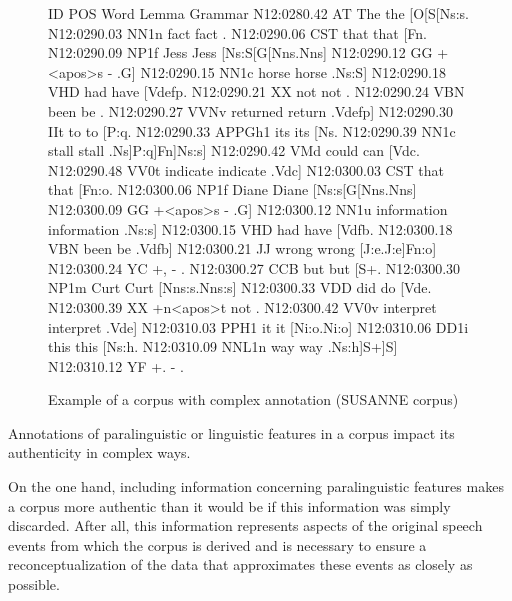 \begin{figure}
\caption{Example of a corpus with complex annotation (SUSANNE corpus)}
\label{fig:susanneannotation}
\hrulefill
\begin{fitverb}
ID           POS     Word         Lemma        Grammar
N12:0280.42  AT      The          the          [O[S[Ns:s.
N12:0290.03  NN1n    fact         fact         .
N12:0290.06  CST     that         that         [Fn.
N12:0290.09  NP1f    Jess         Jess         [Ns:S[G[Nns.Nns]
N12:0290.12  GG      +<apos>s     -            .G]
N12:0290.15  NN1c    horse        horse        .Ns:S]
N12:0290.18  VHD     had          have         [Vdefp.
N12:0290.21  XX      not          not          .
N12:0290.24  VBN     been         be           .
N12:0290.27  VVNv    returned     return        .Vdefp]
N12:0290.30  IIt     to           to           [P:q.
N12:0290.33  APPGh1  its          its          [Ns.
N12:0290.39  NN1c    stall        stall        .Ns]P:q]Fn]Ns:s]
N12:0290.42  VMd     could        can          [Vdc.
N12:0290.48  VV0t    indicate     indicate      .Vdc]
N12:0300.03  CST     that         that         [Fn:o.
N12:0300.06  NP1f    Diane        Diane        [Ns:s[G[Nns.Nns]
N12:0300.09  GG      +<apos>s     -            .G]
N12:0300.12  NN1u    information  information  .Ns:s]
N12:0300.15  VHD     had          have         [Vdfb.
N12:0300.18  VBN     been         be           .Vdfb]
N12:0300.21  JJ      wrong        wrong        [J:e.J:e]Fn:o]
N12:0300.24  YC      +,           -            .
N12:0300.27  CCB     but          but          [S+.
N12:0300.30  NP1m    Curt         Curt         [Nns:s.Nns:s]
N12:0300.33  VDD     did          do           [Vde.
N12:0300.39  XX      +n<apos>t    not          .
N12:0300.42  VV0v    interpret    interpret    .Vde]
N12:0310.03  PPH1    it           it           [Ni:o.Ni:o]
N12:0310.06  DD1i    this         this         [Ns:h.
N12:0310.09  NNL1n   way          way          .Ns:h]S+]S]
N12:0310.12  YF      +.           -            .
\end{fitverb}
\hrulefill
\end{figure}

Annotations  of paralinguistic  or linguistic features in a corpus impact its authenticity  in complex ways.

On the one hand, including information concerning paralinguistic  features makes a corpus more authentic  than it would be if this information was simply discarded. After all, this information represents aspects of the original speech events from which the corpus is derived and is necessary to ensure a reconceptualization of the data that approximates these events as closely as possible.


